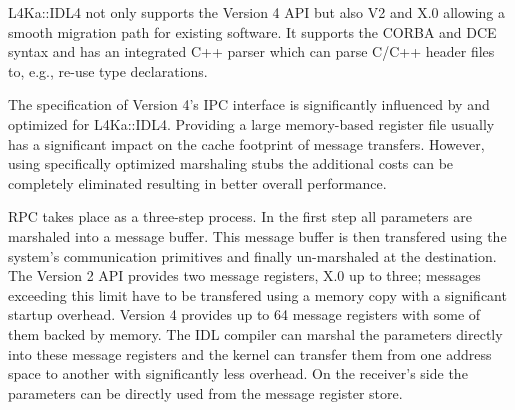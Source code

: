 \documentclass[twoside]{whitepaper}
\newcommand{\IDL}{L4Ka::IDL4\xspace}
\begin{document}
\IDL not only supports the Version 4 API but also V2 and X.0 allowing a
smooth migration path for existing software.  It supports the CORBA
and DCE syntax and has an integrated C++ parser which can parse
C/C++ header files to, e.g., re-use type declarations.

The specification of Version 4's IPC interface is significantly
influenced by and optimized for \IDL.  Providing a large memory-based
register file usually has a significant impact on the cache footprint of
message transfers.  However, using specifically optimized marshaling
stubs the additional costs can be completely eliminated resulting in
better overall performance.

RPC takes place as a three-step process.  In the first step all
parameters are marshaled into a message buffer.  This message buffer
is then transfered using the system's communication primitives and finally
un-marshaled at the destination.  The Version 2 API provides two message
registers, X.0 up to three; messages exceeding this limit have to be
transfered using a memory copy with a significant startup overhead.
Version 4 provides up to 64 message registers with some of them
backed by memory.  The IDL compiler can marshal the parameters directly
into these message registers and the kernel can transfer them from
one address space to another with significantly less overhead.  On the
receiver's side the parameters can be directly used from the message
register store.
\end{document}
